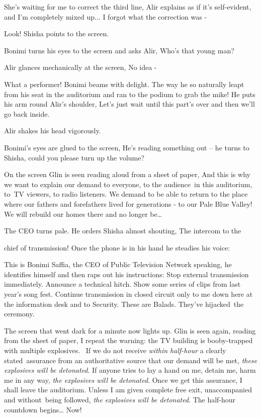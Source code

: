 \documentclass[letterpaper]{article}
\begin{document}
{\textquotedbl}She's waiting for me to correct the third line,{\textquotedbl} Alir explains as if it's self-evident,
{\textquotedbl}and I'm completely mixed up... I forgot what the correction was -{\textquotedbl}

{\textquotedbl}Look!{\textquotedbl} Shisha points to the screen.

Bonimi turns his eyes to the screen and asks Alir, {\textquotedbl}Who's that young man?{\textquotedbl} 

Alir glances mechanically at the screen, {\textquotedbl}No idea -{\textquotedbl}

{\textquotedbl}What a performer!{\textquotedbl} Bonimi beams with delight. {\textquotedbl}The way he so naturally leapt
from his seat in the auditorium and ran to the podium to grab the mike!{\textquotedbl} He puts his arm round Alir's
shoulder, {\textquotedbl}Let's just wait until this part's over and then we'll go back inside.{\textquotedbl} 

Alir shakes his head vigorously.\ 

Bonimi's eyes are glued to the screen, {\textquotedbl}He's reading something out --{\textquotedbl} he turns to Shisha,
{\textquotedbl}could you please turn up the volume?{\textquotedbl}\ 

On the screen Glin is seen reading aloud from a sheet of paper, {\textquotedbl}And this is why we want to explain our
demand to everyone, to the audience~in this auditorium, to~TV viewers, to radio listeners. We demand to be able to
return to the place where our fathers and forefathers lived for generations - to our Pale Blue Valley! We will rebuild
our homes there and no longer be{\dots}{\textquotedbl}

The CEO turns pale. He orders Shisha almost shouting, {\textquotedbl}The intercom to the 

chief of transmission!{\textquotedbl} Once the phone is in his hand he steadies his voice:

{\textquotedbl}This is Bonimi Saffia, the CEO of Public Television Network speaking,{\textquotedbl} he identifies
himself and then raps out his instructions: {\textquotedbl}Stop external transmission immediately. Announce a technical
hitch. Show some series of clips from last year's song fest. Continue transmission in closed circuit only to me down
here at the information desk and to Security. These are Balads. They've hijacked~the ceremony.{\textquotedbl}~~~~~~ 

The screen that went dark for a minute now lights up. Glin is seen again, reading from the sheet of paper,
{\textquotedbl}I repeat the warning: the TV building is booby-trapped with multiple explosives. \ If we do not receive
\textit{within half-hour} a clearly stated~assurance from an authoritative source that our demand will be met,
\textit{these explosives will be detonated}. If anyone tries to lay a hand on me, detain me, harm me in any way,
\textit{the explosives will be detonated}. Once we get this assurance, I shall leave the auditorium. Unless I am given
complete free exit, unaccompanied and without\textcolor[rgb]{0.0,0.4392157,0.7529412}{\ }being followed, \textit{the
explosives will be detonated}. The half-hour countdown begins{\dots} Now!{\textquotedbl}
\end{document}
